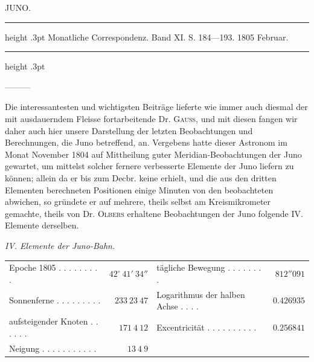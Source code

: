 \par\bigskip
{}
\hypertarget{native-265-lower}{}
\begin{center}
\large JUNO.
\end{center}

\begin{center}
\parbox{.78\linewidth}{%
\centering\fontsize{8.2}{10.2}\selectfont
\hrule height .3pt\relax\vspace{2.5pt}
Monatliche Correspondenz. Band XI. S. 184—193. 1805 Februar.\par
\vspace{2.5pt}\hrule height .3pt\relax
}
\end{center}

\par\indent —\quad—\quad—\par
\par\indent Die interessantesten und wichtigsten Beiträge lieferte wie immer auch diesmal der mit ausdauerndem Fleisse fortarbeitende Dr. \textsc{Gauss}, und mit diesen fangen wir daher auch hier unsere Darstellung
der letzten Beobachtungen und Berechnungen, die Juno betreffend, an. Vergebens hatte dieser Astronom im Monat November 1804 auf Mittheilung guter Meridian-Beobachtungen der Juno gewartet, um
mittelst solcher fernere verbesserte Elemente der Juno liefern zu können; allein da er bis zum Decbr.
keine erhielt, und die aus den dritten Elementen berechneten Positionen einige Minuten von den beobachteten abwichen, so gründete er auf mehrere, theils selbst am Kreismikrometer gemachte, theils von
Dr. \textsc{Olbers} erhaltene Beobachtungen der Juno folgende IV. Elemente derselben.

\begin{center}
\emph{IV. Elemente der Juno-Bahn.}
\end{center}

\begin{center}
\begingroup\fontsize{8.6}{10.6}\selectfont\setlength{\tabcolsep}{2.5pt}\renewcommand{\arraystretch}{1.1}
\begin{tabular}{@{}lr|lr@{}}
Epoche 1805 . . . . . . . . . & $42^\circ\ 41'\ 34''$ & tägliche Bewegung . . . . . . . . & $812''091$ \\
Sonnenferne . . . . . . . . . & $233\ 23\ 47$ & Logarithmus der halben Achse . . . . & $0.426935$ \\
aufsteigender Knoten . . . . . . & $171\ 4\ 12$ & Excentricität . . . . . . . . . . & $0.256841$ \\
Neigung . . . . . . . . . . . & $13\ 4\ 9$ & & \\
\end{tabular}\endgroup
\end{center}

